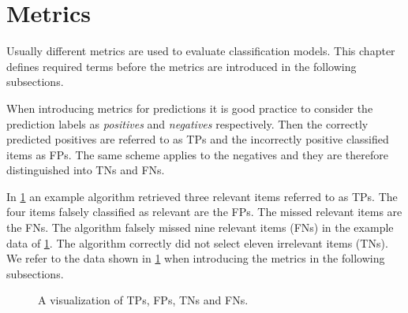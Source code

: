 \section{Metrics}
\label{chp:fundamentals:sec:metrics}

Usually different metrics are used to evaluate classification models.
This chapter defines required terms before the metrics are introduced in the following subsections.

When introducing metrics for predictions it is good practice to consider the prediction labels as \textit{positives} and \textit{negatives} respectively.
Then the correctly predicted positives are referred to as \acp{TP} and the incorrectly positive classified items as \acp{FP}.
The same scheme applies to the negatives and they are therefore distinguished into \acp{TN} and \acp{FN}. \parencite{Powers:2011}

In \cref{fig:metrics:tp_vis} an example algorithm retrieved three relevant items referred to as \acp{TP}.
The four items falsely classified as relevant are the \acp{FP}.
The missed relevant items are the \acp{FN}.
The algorithm falsely missed nine relevant items (\acp{FN}) in the example data of \cref{fig:metrics:tp_vis}.
The algorithm correctly did not select eleven irrelevant items (\acp{TN}).
We refer to the data shown in \cref{fig:metrics:tp_vis} when introducing the metrics in the following subsections.
\begin{figure}[htpb]
    \centering
    \def\svgwidth{\columnwidth}
    
    \caption[Visualization of True Positives]{A visualization of \acp{TP}, \acp{FP}, \acp{TN} and \acp{FN}.}\label{fig:metrics:tp_vis}
\end{figure}






